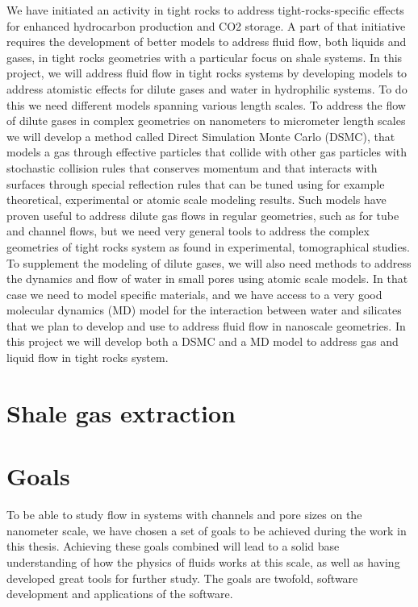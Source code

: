 We have initiated an activity in tight rocks to address tight-rocks-specific effects for enhanced hydrocarbon production and CO2 storage. A part of that initiative requires the development of better models to address fluid flow, both liquids and gases, in tight rocks geometries with a particular focus on shale systems. In this project, we will address fluid flow in tight rocks systems by developing models to address atomistic effects for dilute gases and water in hydrophilic systems. To do this we need different models spanning various length scales. To address the flow of dilute gases in complex geometries on nanometers to micrometer length scales we will develop a method called Direct Simulation Monte Carlo (DSMC), that models a gas through effective particles that collide with other gas particles with stochastic collision rules that conserves momentum and that interacts with surfaces through special reflection rules that can be tuned using for example theoretical, experimental or atomic scale modeling results. Such models have proven useful to address dilute gas flows in regular geometries, such as for tube and channel flows, but we need very general tools to address the complex geometries of tight rocks system as found in experimental, tomographical studies. To supplement the modeling of dilute gases, we will also need methods to address the dynamics and flow of water in small pores using atomic scale models. In that case we need to model specific materials, and we have access to a very good molecular dynamics (MD) model for the interaction between water and silicates that we plan to develop and use to address fluid flow in nanoscale geometries.
In this project we will develop both a DSMC and a MD model to address gas and liquid flow in tight rocks system.
\section{Shale gas extraction}


\section{Goals}
\renewcommand{\thesubsection}{\thesection.\alph{subsection}}
To be able to study flow in systems with channels and pore sizes on the nanometer scale, we have chosen a set of goals to be achieved during the work in this thesis. Achieving these goals combined will lead to a solid base understanding of how the physics of fluids works at this scale, as well as having developed great tools for further study. The goals are twofold, software development and applications of the software. 
